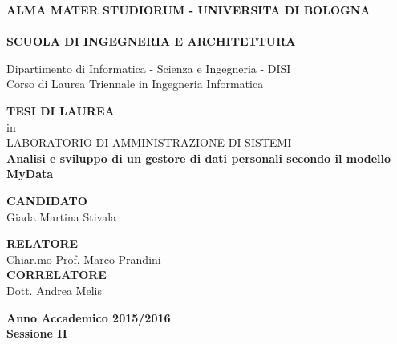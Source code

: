 \thispagestyle{empty}
\begin{titlepage}

\vspace*{-1.5cm}
\begin{center}
  \large
  \textbf{ALMA MATER STUDIORUM - UNIVERSITA DI BOLOGNA}\\
  
  \hrulefill\\
  
  \textbf{SCUOLA DI INGEGNERIA  E ARCHITETTURA}\\
  \vspace*{.75cm}
  
  
  Dipartimento di Informatica - Scienza e Ingegneria - DISI\\
  Corso di Laurea Triennale in Ingegneria Informatica\\
  
  \vspace*{1.2cm}
  
  
  \textbf{TESI DI LAUREA}\\
  \vspace*{.4cm}
  in\\
  \vspace*{.4cm}
  LABORATORIO DI AMMINISTRAZIONE DI SISTEMI\\

  \vspace*{2cm} \LARGE
  \textbf{Analisi e sviluppo di un gestore di dati personali secondo il modello MyData}\\
 \end{center}
 
 \vspace*{3cm}
 
 \begin{flushleft}
  \textbf{CANDIDATO}\\ Giada Martina Stivala \\
\end{flushleft}

\vspace*{-2cm}

 \begin{flushright}
  \textbf{RELATORE}\\ Chiar.mo Prof. Marco Prandini \\
  \vspace*{1.5cm}
  \textbf{CORRELATORE}\\ Dott. Andrea Melis
 \end{flushright}


\vspace*{2cm}

\begin{center}
	\textbf{
  Anno Accademico 2015/2016\\
  Sessione II
  }
\end{center} 
\clearpage
\end{titlepage}
